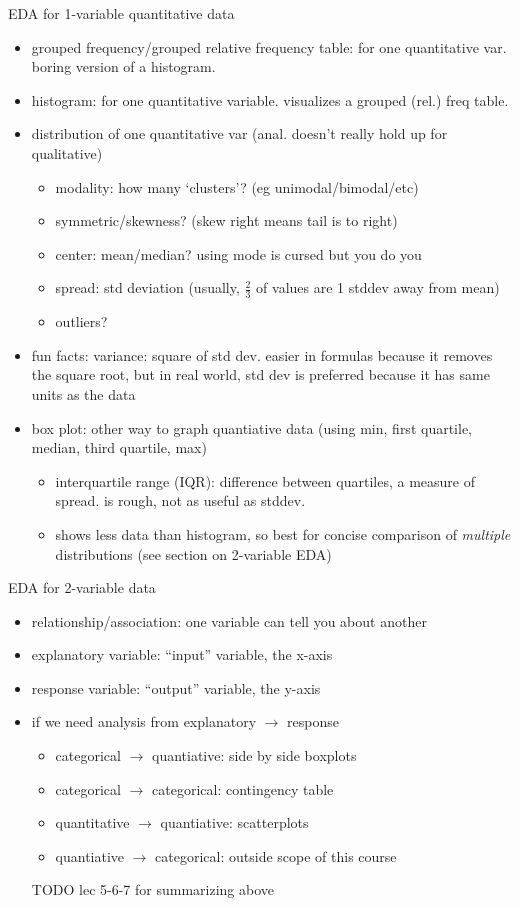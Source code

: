 \documentclass[11pt]{article}
\begin{document}
EDA for 1-variable quantitative data
\begin{itemize}
  \item grouped frequency/grouped relative frequency table: for one quantitative var. boring version of a histogram. 
  \item histogram: for one quantitative variable. visualizes a grouped (rel.) freq table.
  \item distribution of one quantitative var (anal. doesn't really hold up for qualitative)
  \begin{itemize}
    \item modality: how many `clusters'? (eg unimodal/bimodal/etc)
    \item symmetric/skewness? (skew right means tail is to right)
    \item center: mean/median? using mode is cursed but you do you
    \item spread: std deviation (usually, $\frac{2}{3}$ of values are 1 stddev away from mean)
    \item outliers?
  \end{itemize}
  \item fun facts: variance: square of std dev. easier in formulas because it removes the square root, but in real world, std dev is preferred because it has same units as the data
  \item box plot: other way to graph quantiative data (using min, first quartile, median, third quartile, max)
  \begin{itemize}
    \item interquartile range (IQR): difference between quartiles, a measure of spread. is rough, not as useful as stddev.
    \item shows less data than histogram, so best for concise comparison of \emph{multiple} distributions (see section on 2-variable EDA)
  \end{itemize}
\end{itemize}
EDA for 2-variable data
\begin{itemize}
  \item relationship/association: one variable can tell you about another
  \item explanatory variable: ``input'' variable, the x-axis
  \item response variable: ``output'' variable, the y-axis
  \item if we need analysis from explanatory $\rightarrow$ response
  \begin{itemize}
    \item categorical $\rightarrow$ quantiative: side by side boxplots
    \item categorical $\rightarrow$ categorical: contingency table
    \item quantitative $\rightarrow$ quantiative: scatterplots
    \item quantiative $\rightarrow$ categorical: outside scope of this course 
  \end{itemize}
  TODO lec 5-6-7 for summarizing above
\end{itemize}
\end{document}
